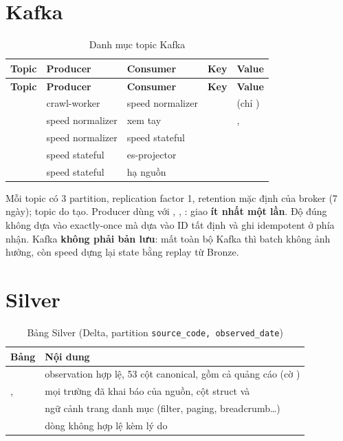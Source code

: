 \section{Kafka}\label{sec:kafka}
\begin{xltabular}{\linewidth}{@{}L{40mm}L{24mm}L{26mm}L{22mm}Y@{}}
  \caption{Danh mục topic Kafka}\label{tab:topics}\\
  \toprule
  \textbf{Topic} & \textbf{Producer} & \textbf{Consumer} & \textbf{Key} & \textbf{Value} \\
  \midrule
  \endfirsthead
  \toprule \textbf{Topic} & \textbf{Producer} & \textbf{Consumer} & \textbf{Key} & \textbf{Value} \\ \midrule
  \endhead
   & crawl-worker & speed normalizer &  &  (chỉ ) \\
   & speed normalizer & xem tay &  & ,  \\
   & speed normalizer & speed stateful &  &  \\
   & speed stateful & es-projector &  &  \\
   & speed stateful & hạ nguồn &  &  \\
  \bottomrule
\end{xltabular}

Mỗi topic có 3 partition, replication factor 1, retention mặc định của broker (7 ngày); topic do  tạo.
Producer dùng  với , , : giao \textbf{ít nhất một lần}.
Độ đúng không dựa vào exactly-once mà dựa vào ID tất định và ghi idempotent ở phía nhận.
Kafka \textbf{không phải bản lưu}: mất toàn bộ Kafka thì batch không ảnh hưởng, còn speed dựng lại state bằng replay từ Bronze.

\section{Silver}\label{sec:silver}
\begin{xltabular}{\linewidth}{@{}L{42mm}Y@{}}
  \caption{Bảng Silver (Delta, partition \texttt{source\_code, observed\_date})}\label{tab:silver-tables}\\
  \toprule
  \textbf{Bảng} & \textbf{Nội dung} \\
  \midrule
   & observation hợp lệ, 53 cột canonical, gồm cả quảng cáo (cờ ) \\
  ,  & mọi trường đã khai báo của nguồn, cột struct  và  \\
   & ngữ cảnh trang danh mục (filter, paging, breadcrumb\ldots) \\
   & dòng không hợp lệ kèm lý do \\
  \bottomrule
\end{xltabular}

